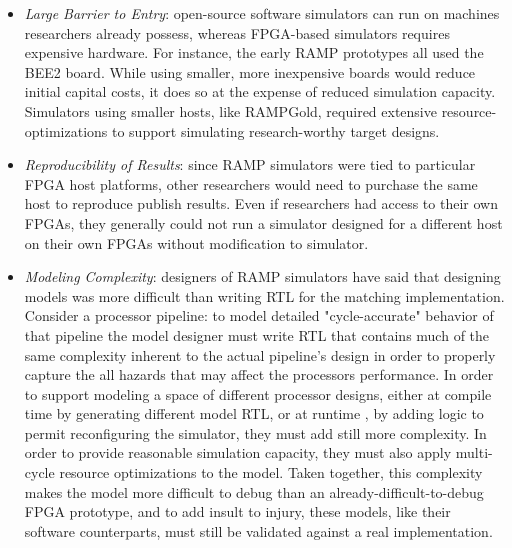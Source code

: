 \begin{itemize}
    \item \emph{Large Barrier to Entry}: open-source software simulators can run on machines researchers already possess,
whereas FPGA-based simulators requires expensive hardware. For instance, the early RAMP prototypes all used
the BEE2 board. While using smaller, more inexpensive boards would reduce initial capital costs, it does so at the expense of reduced simulation capacity.
Simulators using smaller hosts, like RAMPGold, required extensive resource-optimizations to support simulating research-worthy target designs.

\item \emph{Reproducibility of Results}: since RAMP simulators were tied to particular FPGA host
platforms, other researchers would need to purchase the same host to reproduce
publish results. Even if researchers had access to their own FPGAs, they
generally could not run a simulator designed for a different host on their own
FPGAs without modification to simulator.

\item \emph{Modeling Complexity}: designers of RAMP simulators have said that
designing models was more difficult than writing RTL for the matching implementation.
Consider a processor pipeline: to model detailed "cycle-accurate" behavior of that pipeline
the model designer must write RTL that contains much of the same complexity inherent to the actual pipeline's design in order
to properly capture the all hazards that may affect the processors performance.
In order to support modeling a space of different processor designs, either at compile time by generating different model RTL, or at runtime
, by adding logic to permit reconfiguring the simulator, they must add still more complexity.
In order to provide reasonable simulation capacity, they must also apply multi-cycle resource optimizations to the model.
Taken together, this complexity makes the model more difficult to debug than an already-difficult-to-debug FPGA prototype,
and to add insult to injury, these models, like their software counterparts, must still be validated against a real implementation.
\end{itemize}

%
%
%
%
%
%
%
%
%


